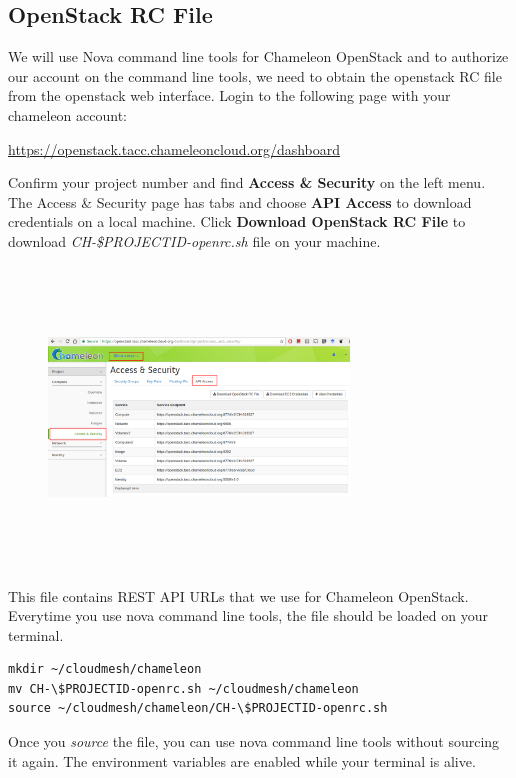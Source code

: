 \subsection{OpenStack RC File}

We will use Nova command line tools for Chameleon OpenStack and to
authorize our account on the command line tools, we need to obtain the
openstack RC file from the openstack web interface. Login to the
following page with your chameleon account:


\url{https://openstack.tacc.chameleoncloud.org/dashboard}

Confirm your project number and find \textbf{Access \& Security} on
the left menu.  The Access \& Security page has tabs and choose
\textbf{API Access} to download credentials on a local machine. Click
\textbf{Download OpenStack RC File} to download
\textit{CH-\$PROJECTID-openrc.sh} file on your machine.

  \begin{figure}[!htbp]
    \includegraphics[width=8cm,height=8cm]{section/cloud/chameleon/images/openstack-chameleon-openrc.png}
    \centering
  \end{figure}

  This file contains REST API URLs that we use for Chameleon
  OpenStack.  Everytime you use nova command line tools, the file
  should be loaded on your terminal.

\begin{lstlisting}
mkdir ~/cloudmesh/chameleon
mv CH-\$PROJECTID-openrc.sh ~/cloudmesh/chameleon
source ~/cloudmesh/chameleon/CH-\$PROJECTID-openrc.sh
\end{lstlisting}

Once you \textit{source} the file, you can use nova command line tools
without sourcing it again.  The environment variables are enabled
while your terminal is alive.


